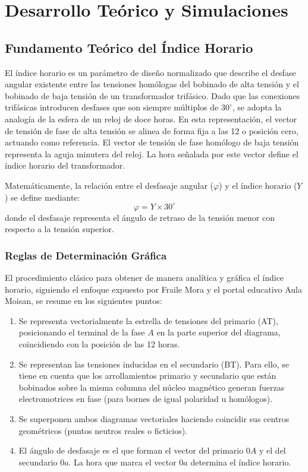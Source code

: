 \chapter{Desarrollo Teórico y Simulaciones}

\section{Fundamento Teórico del Índice Horario}

El índice horario es un parámetro de diseño normalizado que describe el desfase angular existente entre las tensiones
homólogas del bobinado de alta tensión y el bobinado de baja tensión de un transformador trifásico. Dado que las
conexiones trifásicas introducen desfases que son siempre múltiplos de $30^\circ$, se adopta la analogía de la esfera
de un reloj de doce horas. En esta representación, el vector de tensión de fase de alta tensión se alinea de forma fija
a las 12 o posición cero, actuando como referencia. El vector de tensión de fase homólogo de baja tensión representa la
aguja minutera del reloj. La hora señalada por este vector define el índice horario del transformador.

Matemáticamente, la relación entre el desfasaje angular ($\varphi$) y el índice horario ($Y$) se define mediante:
\begin{equation}
    \varphi = Y \times 30^\circ
\end{equation}
donde el desfasaje representa el ángulo de retraso de la tensión menor con respecto a la tensión superior.

\subsection{Reglas de Determinación Gráfica}
El procedimiento clásico para obtener de manera analítica y gráfica el índice horario, siguiendo el enfoque expuesto por
Fraile Mora y el portal educativo Aula Moisan, se resume en los siguientes puntos:
\begin{enumerate}
    \item Se representa vectorialmente la estrella de tensiones del primario (AT), posicionando el terminal de la fase $A$
    en la parte superior del diagrama, coincidiendo con la posición de las 12 horas.
    \item Se representan las tensiones inducidas en el secundario (BT). Para ello, se tiene en cuenta que los arrollamientos
    primario y secundario que están bobinados sobre la misma columna del núcleo magnético generan fuerzas electromotrices
    en fase (para bornes de igual polaridad u homólogos).
    \item Se superponen ambos diagramas vectoriales haciendo coincidir sus centros geométricos (puntos neutros reales o ficticios).
    \item El ángulo de desfasaje es el que forman el vector del primario $0A$ y el del secundario $0a$. La hora que marca
    el vector $0a$ determina el índice horario.
\end{enumerate}

